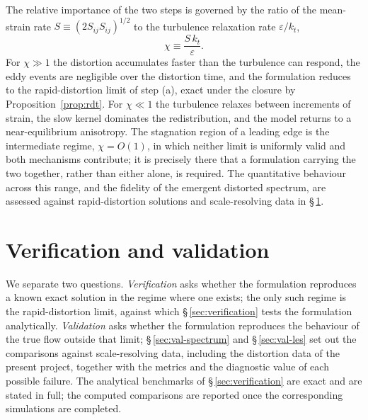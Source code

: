 \documentclass[lineno]{JFM-FLM_Au}
\begin{document}
The relative importance of the two steps is governed by the ratio of the
mean-strain rate $S\equiv(2S_{ij}S_{ij})^{1/2}$ to the turbulence
relaxation rate $\varepsilon/k_t$,
\begin{equation}
  \chi \equiv \frac{S\,k_t}{\varepsilon}.
  \label{eq:chi}
\end{equation}
For $\chi\gg1$ the distortion accumulates faster than the turbulence can
respond, the eddy events are negligible over the distortion time, and the
formulation reduces to the rapid-distortion limit of step (a), exact under
the closure by Proposition~\ref{prop:rdt}. For $\chi\ll1$ the turbulence
relaxes between increments of strain, the slow kernel dominates the
redistribution, and the model returns to a near-equilibrium anisotropy. The
stagnation region of a leading edge is the intermediate regime, $\chi=
O(1)$, in which neither limit is uniformly valid and both mechanisms
contribute; it is precisely there that a formulation carrying the two
together, rather than either alone, is required. The quantitative behaviour
across this range, and the fidelity of the emergent distorted spectrum, are
assessed against rapid-distortion solutions and scale-resolving data in
\S\,\ref{sec:validation}.

%
%

\section{Verification and validation}\label{sec:validation}

We separate two questions. \emph{Verification} asks whether the
formulation reproduces a known exact solution in the regime where one
exists; the only such regime is the rapid-distortion limit, against which
\S\,\ref{sec:verification} tests the formulation analytically. \emph{Validation}
asks whether the formulation reproduces the behaviour of the true flow
outside that limit; \S\,\ref{sec:val-spectrum} and \S\,\ref{sec:val-les}
set out the comparisons against scale-resolving data, including the
distortion data of the present project, together with the metrics and the
diagnostic value of each possible failure. The analytical benchmarks of
\S\,\ref{sec:verification} are exact and are stated in full; the computed
comparisons are reported once the corresponding simulations are completed.
\end{document}

